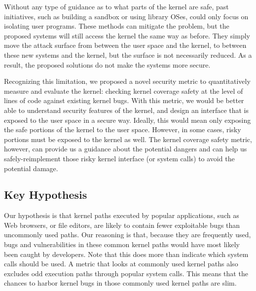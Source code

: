Without any type of guidance as to what parts of the kernel are safe, past
initiatives, 
such as building a sandbox or using library OSes, could only focus on
isolating user programs.  
These methods can mitigate the problem, but the proposed systems will still
access the kernel the same way as before. 
They simply move the attack surface from between the user space and the
kernel, 
to between these new systems and the kernel, but the surface is not
necessarily reduced. 
As a result, the proposed solutions do not make the systems more secure. 

Recognizing this limitation, we proposed a novel security metric to
quantitatively measure and evaluate the kernel: 
checking kernel coverage safety at the level of lines of code against
existing kernel bugs. 
With this metric, we would be better able to understand security features
of the kernel, 
and design an interface that is exposed to the user space in a secure way.
Ideally, 
this would mean only exposing the safe portions of the kernel to the user
space. 
However, in some cases, risky portions must be exposed to the kernel as
well. 
The kernel coverage safety metric, however, can provide us a guidance 
about the potential dangers and 
can help us safely-reimplement those risky kernel interface (or system
calls) to avoid the potential damage.









\subsection{Key Hypothesis}

Our hypothesis is that kernel paths executed by popular applications, 
such as Web browsers, or file editors, are likely to contain fewer
exploitable bugs 
than uncommonly used paths. Our reasoning is that, because they are
frequently used, 
bugs and vulnerabilities in these common kernel paths
would have most likely been caught by developers. 
Note that this does more than indicate which system calls should be used. 
A metric that looks at commonly used kernel paths also excludes odd
execution paths 
through popular system calls. 
This means that the chances to harbor kernel bugs in those commonly used
kernel paths are slim. 

